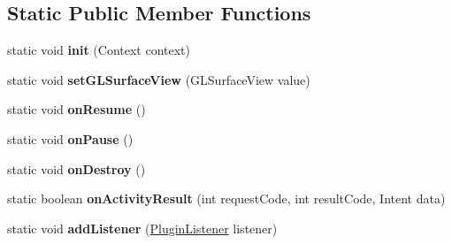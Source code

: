 \subsection*{Static Public Member Functions}
\begin{DoxyCompactItemize}
\item 
\mbox{\label{classorg_1_1cocos2dx_1_1plugin_1_1PluginWrapper_a56754b2a19e9d0657fa2fb2dd08dcba7}} 
static void {\bfseries init} (Context context)
\item 
\mbox{\label{classorg_1_1cocos2dx_1_1plugin_1_1PluginWrapper_a6318e0c9196d34cd29f98351af647b9e}} 
static void {\bfseries set\+G\+L\+Surface\+View} (G\+L\+Surface\+View value)
\item 
\mbox{\label{classorg_1_1cocos2dx_1_1plugin_1_1PluginWrapper_afa3b3ecab8c25dce347759c43fcf6e4f}} 
static void {\bfseries on\+Resume} ()
\item 
\mbox{\label{classorg_1_1cocos2dx_1_1plugin_1_1PluginWrapper_a0c4cf22ee1610e160a5761bc1c1360b3}} 
static void {\bfseries on\+Pause} ()
\item 
\mbox{\label{classorg_1_1cocos2dx_1_1plugin_1_1PluginWrapper_a69e5ec7a2c0277a8a6e64bf4798843a6}} 
static void {\bfseries on\+Destroy} ()
\item 
\mbox{\label{classorg_1_1cocos2dx_1_1plugin_1_1PluginWrapper_a012d7b2c36029383fee71d55765d206a}} 
static boolean {\bfseries on\+Activity\+Result} (int request\+Code, int result\+Code, Intent data)
\item 
\mbox{\label{classorg_1_1cocos2dx_1_1plugin_1_1PluginWrapper_a75ea703fd211435cd77f93922e23ff06}} 
static void {\bfseries add\+Listener} (\hyperlink{interfaceorg_1_1cocos2dx_1_1plugin_1_1PluginListener}{Plugin\+Listener} listener)
\item 
\mbox{\label{classorg_1_1cocos2dx_1_1plugin_1_1PluginWrapper_a9407aaa001a15455fb83486cf91645f5}} 

\end{DoxyCompactItemize}
